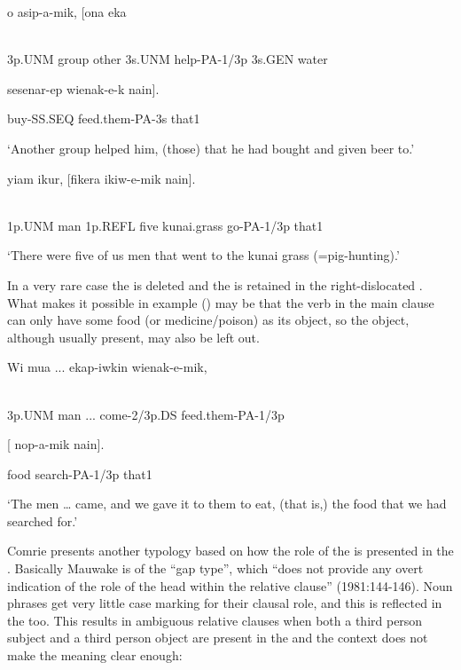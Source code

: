 \ea%
\label{ex:x1533}
\gll {}  o  asip-a-mik,  [ona  eka  \\
      \\
\glt
\z

3p.UNM  group  other  3s.UNM  help-PA-1/3p  3s.GEN  water

sesenar-ep  wienak-e-k  nain].

buy-SS.SEQ  feed.them-PA-3s  that1

`Another group helped him, (those) that he had bought and given beer to.'

\ea%
\label{ex:x1534}
\gll {}  yiam  ikur,  [fikera  ikiw-e-mik  nain]. \\
      \\
\glt
\z

1p.UNM  man  1p.REFL  five  kunai.grass  go-PA-1/3p  that1

`There were five of us men that went to the kunai grass (=pig-hunting).'

In a very rare case the  is deleted and the  is retained in the right-dislocated . What makes it possible in example () may be that the verb in the main clause can only have some food (or medicine/poison) as its object, so the object, although usually present, may also be left out.

\ea%
\label{ex:x1535}
\gll Wi  mua  ...  ekap-iwkin  wienak-e-mik, \\
      \\
\glt
\z

3p.UNM  man  ...  come-2/3p.DS  feed.them-PA-1/3p

[  nop-a-mik  nain].

food  search-PA-1/3p  that1

`The men {\dots} came, and we gave it to them to eat, (that is,) the food that we had searched for.'

Comrie presents another typology based on how the role of the  is presented in the . Basically Mauwake is of the ``gap type'', which ``does not provide any overt indication of the role of the head within the relative clause'' (1981:144-146). Noun phrases get very little case marking for their clausal role, and this is reflected in the  too. This results in ambiguous relative clauses when both a third person subject  and a third person object  are present in the  and the context does not make the meaning clear enough:

